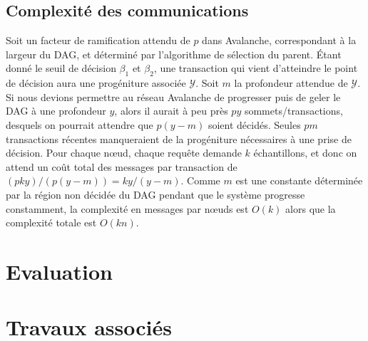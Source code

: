 \documentclass[letterpaper,twocolumn,10pt]{article}
\theoremstyle{definition}
\begin{document}
\subsection{Complexité des communications}
Soit un facteur de ramification attendu de $p$ dans Avalanche, correspondant à la largeur du DAG, et déterminé par l'algorithme de sélection du parent.
Étant donné le seuil de décision $\beta_1$ et $\beta_2$, une transaction qui vient d'atteindre le point de décision aura une progéniture associée $\mathcal{Y}$.
Soit $m$ la profondeur attendue de $\mathcal{Y}$.
Si nous devions permettre au réseau Avalanche de progresser puis de geler le DAG à une profondeur $y$, alors il aurait à peu près $py$ sommets/transactions, desquels on pourrait attendre que $p(y - m)$ soient décidés.
Seules $pm$ transactions récentes manqueraient de la progéniture nécessaires à une prise de décision.
Pour chaque nœud, chaque requête demande $k$ échantillons, et donc on attend un coût total des messages par transaction de $(pky) / (p(y - m)) = ky/(y-m)$.
Comme $m$ est une constante déterminée par la région non décidée du DAG pendant que le système progresse constamment, la complexité en messages par nœuds est $O(k)$ alors que la complexité totale est $O(kn)$.

\section{Evaluation}
\label{sec:evaluation}


\section{Travaux associés}
\label{sec:related-work}

\end{document}
